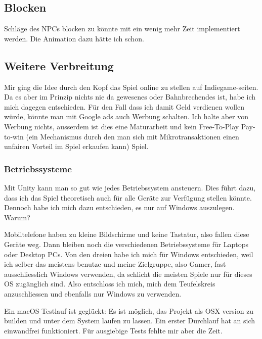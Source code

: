 \subsection{Blocken}
Schläge des NPCs blocken zu könnte mit ein wenig mehr Zeit implementiert werden.
Die Animation dazu hätte ich schon.
\subsection{Weitere Verbreitung}

Mir ging die Idee durch den Kopf das Spiel online zu stellen auf Indiegame-seiten.
Da es aber im Prinzip nichts nie da gewesenes oder Bahnbrechendes ist, habe ich mich dagegen entschieden.
Für den Fall dass ich damit Geld verdienen wollen würde, könnte man mit Google ads auch Werbung schalten.
Ich halte aber von Werbung nichts, ausserdem ist dies eine Maturarbeit und kein Free-To-Play Pay-to-win 
(ein Mechanismus durch den man sich mit Mikrotransaktionen einen unfairen Vorteil im Spiel erkaufen kann) 
Spiel.

\subsubsection{Betriebssysteme}
Mit Unity kann man so gut wie jedes Betriebssystem ansteuern.
Dies führt dazu, dass ich das Spiel theoretisch auch für alle Geräte zur Verfügung stellen könnte. 
Dennoch habe ich mich dazu entschieden, es nur auf Windows auszulegen.
Warum?

Mobiltelefone haben zu kleine Bildschirme und keine Tastatur, also fallen diese Geräte weg. Dann bleiben noch die verschiedenen Betriebssysteme für Laptops oder Desktop PCs.
Von den dreien habe ich mich für Windows entschieden, weil ich selber das meistens benutze und meine \glqq Zielgruppe\grqq, also Gamer, fast ausschliesslich Windows verwenden, da schlicht die meisten Spiele nur für dieses OS zugänglich sind. Also entschloss ich mich, mich dem Teufelskreis anzuschliessen und ebenfalls nur Windows zu verwenden.

Ein macOS Testlauf ist geglückt: Es ist möglich, das Projekt als OSX version zu builden und unter dem System laufen zu lassen. Ein erster Durchlauf hat an sich einwandfrei funktioniert. Für ausgiebige Tests fehlte mir aber die Zeit.
